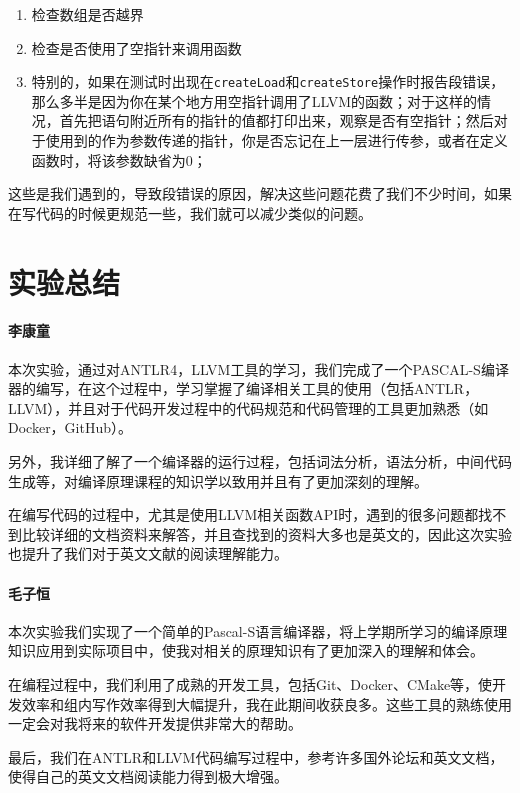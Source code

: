 \documentclass[lang=cn,11pt,a4paper,cite=authornum]{paper}
\begin{document}
\begin{enumerate}
    \item 检查数组是否越界
    \item 检查是否使用了空指针来调用函数
    \item 特别的，如果在测试时出现在\texttt{createLoad}和\texttt{createStore}操作时报告段错误，那么多半是因为你在某个地方用空指针调用了LLVM的函数；对于这样的情况，首先把语句附近所有的指针的值都打印出来，观察是否有空指针；然后对于使用到的作为参数传递的指针，你是否忘记在上一层进行传参，或者在定义函数时，将该参数缺省为0；
\end{enumerate}

这些是我们遇到的，导致段错误的原因，解决这些问题花费了我们不少时间，如果在写代码的时候更规范一些，我们就可以减少类似的问题。

\section{实验总结}

\paragraph{李康童} 本次实验，通过对ANTLR4，LLVM工具的学习，我们完成了一个PASCAL-S编译器的编写，在这个过程中，学习掌握了编译相关工具的使用（包括ANTLR，LLVM），并且对于代码开发过程中的代码规范和代码管理的工具更加熟悉（如Docker，GitHub）。

另外，我详细了解了一个编译器的运行过程，包括词法分析，语法分析，中间代码生成等，对编译原理课程的知识学以致用并且有了更加深刻的理解。

在编写代码的过程中，尤其是使用LLVM相关函数API时，遇到的很多问题都找不到比较详细的文档资料来解答，并且查找到的资料大多也是英文的，因此这次实验也提升了我们对于英文文献的阅读理解能力。

\paragraph{毛子恒} 本次实验我们实现了一个简单的Pascal-S语言编译器，将上学期所学习的编译原理知识应用到实际项目中，使我对相关的原理知识有了更加深入的理解和体会。

在编程过程中，我们利用了成熟的开发工具，包括Git、Docker、CMake等，使开发效率和组内写作效率得到大幅提升，我在此期间收获良多。这些工具的熟练使用一定会对我将来的软件开发提供非常大的帮助。

最后，我们在ANTLR和LLVM代码编写过程中，参考许多国外论坛和英文文档，使得自己的英文文档阅读能力得到极大增强。
\end{document}

